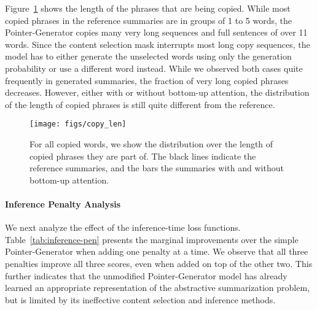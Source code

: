 \documentclass[11pt,a4paper]{article}
\begin{document}
Figure~\ref{fig:copy_length} shows the length of the phrases that are being copied. While most copied phrases in the reference summaries are in groups of 1 to 5 words, the Pointer-Generator copies many very long sequences and full sentences of over 11 words. Since the content selection mask interrupts most long copy sequences, the model has to either generate the unselected words using only the generation probability or use a different word instead. While we observed both cases quite frequently in generated summaries, the fraction of very long copied phrases decreases. However, either with or without bottom-up attention, the distribution of the length of copied phrases is still quite different from the reference.

\begin{figure}[t]
\centering
\texttt{[image: figs/copy\_len]}
\caption{For all copied words, we show the distribution over the length of copied phrases they are part of. The black lines indicate the reference summaries, and the bars the summaries with and without bottom-up attention.}
\label{fig:copy_length}
\end{figure}






\paragraph{Inference Penalty Analysis}

We next analyze the effect of the inference-time loss functions. Table~\ref{tab:inference-pen} presents the marginal improvements over the simple Pointer-Generator when adding one penalty at a time. We observe that all three penalties improve all three scores, even when added on top of the other two. This further indicates that the unmodified Pointer-Generator model has already learned an appropriate representation of the abstractive summarization problem, but is limited by its ineffective content selection and inference methods. 
\end{document}
